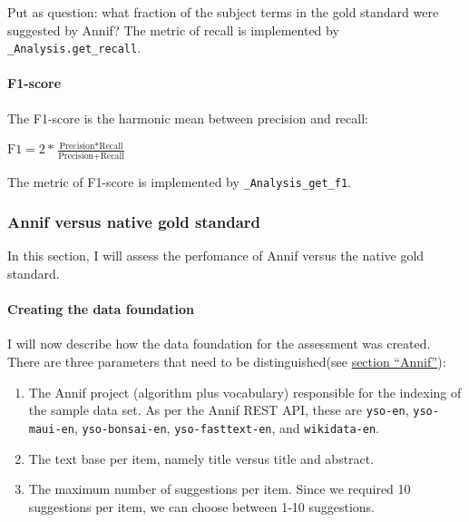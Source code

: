 Put as question: what fraction of the subject terms in the gold standard
were suggested by Annif? The metric of recall is implemented by
\texttt{\_Analysis.get\_recall}.

\hypertarget{f1-score}{%
\paragraph{F1-score}\label{f1-score}}

The F1-score is the harmonic mean between precision and recall:

\begin{center} 
$\text{F1} = \displaystyle 2 * \frac{\text{Precision} * \text{Recall}}{\text{Precision} + \text{Recall}}$
\end{center}

The metric of F1-score is implemented by \texttt{\_Analysis\_get\_f1}.

\hypertarget{annif-versus-native-gold-standard}{%
\subsubsection{Annif versus native gold
standard}\label{annif-versus-native-gold-standard}}

In this section, I will assess the perfomance of Annif versus the native
gold standard.

\hypertarget{creating-the-data-foundation}{%
\paragraph{Creating the data
foundation}\label{creating-the-data-foundation}}

I will now describe how the data foundation for the assessment was
created. There are three parameters that need to be distinguished(see
\protect\hyperlink{annif}{section ``Annif''}):

\begin{enumerate}
\def\labelenumi{\arabic{enumi}.}
\tightlist
\item
  The Annif project (algorithm plus vocabulary) responsible for the
  indexing of the sample data set. As per the Annif REST API, these are
  \texttt{yso-en}, \texttt{yso-maui-en}, \texttt{yso-bonsai-en},
  \texttt{yso-fasttext-en}, and \texttt{wikidata-en}.
\item
  The text base per item, namely title versus title and abstract.
\item
  The maximum number of suggestions per item. Since we required 10
  suggestions per item, we can choose between 1-10 suggestions.
\end{enumerate}

